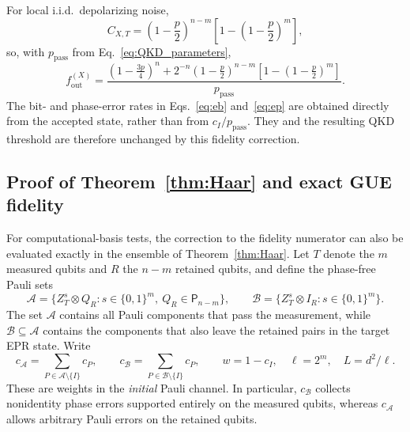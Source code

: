 \documentclass[onecolumn,prx,longbibliography,nofootinbib, superscriptaddress]{revtex4-2}
\theoremstyle{recap}
\begin{document}
For local i.i.d.\ depolarizing noise,
\begin{equation}
    C_{X,T}=\left(1-\frac p2\right)^{n-m}
        \left[1-\left(1-\frac p2\right)^m\right],
\end{equation}
so, with $p_{\mathrm{pass}}$ from Eq.~\eqref{eq:QKD_parameters},
\begin{equation}\label{eq:diagonal_depolarizing_fidelity}
    f_{\mathrm{out}}^{(X)}=
    \frac{\left(1-\frac{3p}{4}\right)^n
      +2^{-n}\left(1-\frac p2\right)^{n-m}
       \left[1-\left(1-\frac p2\right)^m\right]}{p_{\mathrm{pass}}}.
\end{equation}
The bit- and phase-error rates in Eqs.~\eqref{eq:eb} and~\eqref{eq:ep} are obtained directly from the accepted state, rather than from $c_I/p_{\mathrm{pass}}$. They and the resulting QKD threshold are therefore unchanged by this fidelity correction.


\subsection{Proof of Theorem~\ref{thm:Haar} and exact GUE fidelity}\label{appendix:GUE_exact_fidelity}

For computational-basis tests, the correction to the fidelity numerator can also be evaluated exactly in the ensemble of Theorem~\ref{thm:Haar}. Let $T$ denote the $m$ measured qubits and $R$ the $n-m$ retained qubits, and define the phase-free Pauli sets
\begin{equation}
    \mathcal A=\{Z_T^s\otimes Q_R:s\in\{0,1\}^m,\ Q_R\in\mathsf P_{n-m}\},\qquad
    \mathcal B=\{Z_T^s\otimes I_R:s\in\{0,1\}^m\}.
\end{equation}
The set $\mathcal A$ contains all Pauli components that pass the measurement, while $\mathcal B\subseteq\mathcal A$ contains the components that also leave the retained pairs in the target EPR state. Write
\begin{equation}\label{eq:GUE_coefficient_sums}
    c_{\mathcal A}=\sum_{P\in\mathcal A\setminus\{I\}}c_P,\qquad
    c_{\mathcal B}=\sum_{P\in\mathcal B\setminus\{I\}}c_P,\qquad
    w=1-c_I,\quad \ell=2^m,\quad L=d^2/\ell.
\end{equation}
These are weights in the \emph{initial} Pauli channel. In particular, $c_{\mathcal B}$ collects nonidentity phase errors supported entirely on the measured qubits, whereas $c_{\mathcal A}$ allows arbitrary Pauli errors on the retained qubits.
\end{document}
